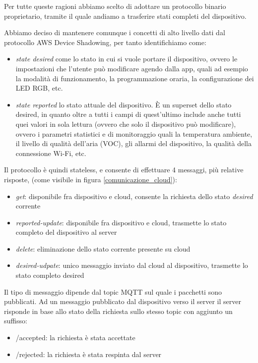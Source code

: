 \documentclass[a4paper,titlepage]{article}
\begin{document}
Per tutte queste ragioni abbiamo scelto di adottare un protocollo binario proprietario,
tramite il quale andiamo a trasferire stati completi del dispositivo.

Abbiamo deciso di mantenere comunque i concetti di alto livello dati dal protocollo AWS
Device Shadowing, per tanto identifichiamo come:
\begin{itemize}
    \item \textit{state desired} come lo stato in cui si vuole portare il dispositivo, ovvero le
        impostazioni che l'utente può modificare agendo dalla app, quali ad esempio la modalità di funzionamento,
        la programmazione oraria, la configurazione dei LED RGB, etc.
    \item \textit{state reported} lo stato attuale del dispositivo. È un superset dello stato
        desired, in quanto oltre a tutti i campi di quest'ultimo include anche tutti quei valori
        in sola lettura (ovvero che solo il dispositivo può modificare), ovvero i parametri
        statistici e di monitoraggio quali la temperatura ambiente, il livello di qualità dell'aria (VOC),
        gli allarmi del dispositivo, la qualità della connessione Wi-Fi, etc.
\end{itemize}

Il protocollo è quindi stateless, e consente di effettuare 4 messaggi, più relative risposte,
(come visibile in figura \ref{comunicazione_cloud}):

\begin{itemize}
    \item \textit{get}: disponibile fra dispositivo e cloud, consente la richiesta dello stato \textit{desired} corrente
    \item \textit{reported-update}: disponibile fra dispositivo e cloud, trasmette lo stato
        completo del dispositivo al server
    \item \textit{delete}: eliminazione dello stato corrente presente su cloud
    \item \textit{desired-udpate}: unico messaggio inviato dal cloud al dispositivo,
        trasmette lo stato completo desired
\end{itemize}

Il tipo di messaggio dipende dal topic MQTT sul quale i pacchetti sono pubblicati. Ad
un messaggio pubblicato dal dispositivo verso il server il server risponde in base allo
stato della richiesta sullo stesso topic con aggiunto un suffisso:
\begin{itemize}
    \item /accepted: la richiesta è stata accettate
    \item /rejected: la richiesta è stata respinta dal server
\end{itemize}
\end{document}
